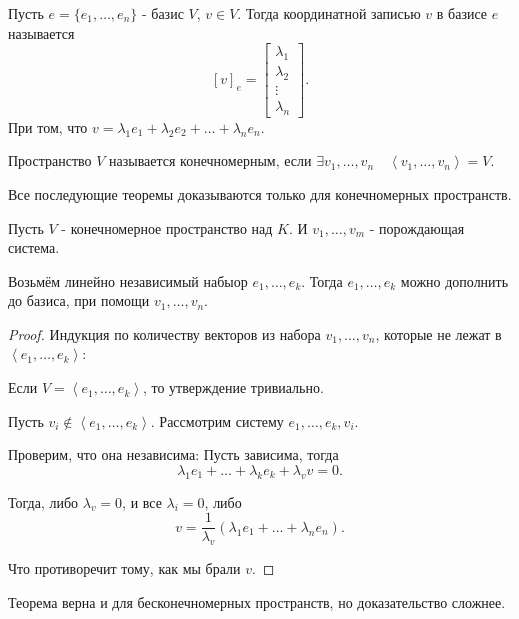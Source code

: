 \begin{definition} \thmslashn 

    Пусть $e = \{ e_1, \ldots, e_{n}\}$ - базис $V$, $v\in V$. Тогда координатной записью $v$ в базисе $e$ называется
    \[ [v]_{e} = \begin{bmatrix} \lambda_1\\ \lambda_2\\ \vdots\\ \lambda_{n} \end{bmatrix}  .\] 
    При том, что $v = \lambda_1e_1 + \lambda_2e_2 + \ldots + \lambda_{n}e_{n}$.
\end{definition}
\begin{definition} \thmslashn 

Пространство $V$ называется конечномерным, если $\exists{v_1, \ldots, v_{n}}\quad \left<v_1, \ldots, v_{n}\right> = V$.
\end{definition}
Все последующие теоремы доказываются только для конечномерных пространств.
\begin{theorem} \thmslashn

    Пусть $V$ - конечномерное пространство над $K$. И $v_1, \ldots, v_{m}$ - порождающая система.

    Возьмём линейно независимый набыор $e_1, \ldots, e_{k}$. Тогда $e_1, \ldots, e_{k}$ можно дополнить до базиса, при помощи $v_1, \ldots, v_{n}$.
    \begin{proof} \thmslashn
       
        Индукция по количеству векторов из набора $v_1, \ldots, v_{n}$, которые не лежат в $\left<e_1, \ldots, e_{k}\right>$:

        Если $V = \left<e_1, \ldots, e_{k}\right>$, то утверждение тривиально.

        Пусть $v_{i} \not\in \left<e_1, \ldots, e_{k}\right>$. Рассмотрим систему $e_1, \ldots, e_{k}, v_{i}$.

        Проверим, что она независима: Пусть зависима, тогда
        \[ \lambda_{1}e_1 + \ldots + \lambda_{k}e_{k} + \lambda_{v}v = 0 .\]

        Тогда, либо $\lambda_{v} = 0$, и все $\lambda_{i} = 0$, либо 
        \[ v = \frac{1}{\lambda_{v}}\left( \lambda_1e_1 + \ldots + \lambda_{n}e_{n} \right)  .\]

        Что противоречит тому, как мы брали $v$.
    \end{proof}
\end{theorem}
\begin{remark} \thmslashn

    Теорема верна и для бесконечномерных пространств, но доказательство сложнее.
\end{remark}
